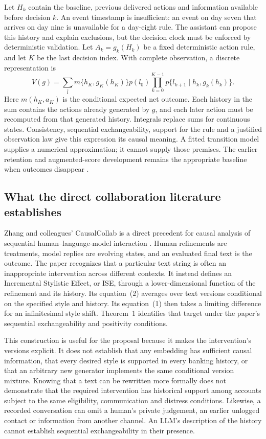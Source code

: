 Let $H_k$ contain the baseline, previous delivered actions and information
available before decision $k$. An event timestamp is insufficient: an event
on day seven that arrives on day nine is unavailable for a day-eight rule.
The assistant can propose this history and explain exclusions, but the
decision clock must be enforced by deterministic validation.
Let $A_k=g_k(H_k)$ be a fixed deterministic action rule, and let $K$ be the
last decision index. With complete observation, a discrete representation is
\begin{equation}
 V(g)=
 \sum_{\bar l}
 m\{h_K,g_K(h_K)\}p(l_0)
 \prod_{k=0}^{K-1}
 p\{l_{k+1}\mid h_k,g_k(h_k)\}.
 \label{eq:exec16-policy-recursion}
\end{equation}
Here $m(h_K,a_K)$ is the conditional expected net outcome. Each history in
the sum contains the actions already generated by $g$, and each later action
must be recomputed from that generated history. Integrals replace sums for
continuous states. Consistency, sequential exchangeability, support for the
rule and a justified observation law give this expression its causal
meaning. A fitted transition model supplies a numerical approximation; it
cannot supply those premises. The earlier retention and augmented-score
development remains the appropriate baseline when outcomes disappear
\citep{hernan2020}.

\subsection{What the direct collaboration literature establishes}

Zhang and colleagues' CausalCollab is a direct precedent for causal analysis
of sequential human--language-model interaction
\citep{exec13_census_collaboration}. Human refinements are treatments,
model replies are evolving states, and an evaluated final text is the
outcome. The paper recognizes that a particular text string is often an
inappropriate intervention across different contexts. It instead defines an
Incremental Stylistic Effect, or ISE, through a lower-dimensional function
of the refinement and its history. Its equation~(2) averages over text
versions conditional on the specified style and history. Its equation~(1)
then takes a limiting difference for an infinitesimal style shift.
Theorem~1 identifies that target under the paper's sequential
exchangeability and positivity conditions.

This construction is useful for the proposal because it makes the
intervention's versions explicit. It does not establish that any
embedding has sufficient causal information, that every desired style is
supported in every banking history, or that an arbitrary new generator
implements the same conditional version mixture.
Knowing that a text can be rewritten more formally does not demonstrate
that the required intervention has historical support among accounts
subject to the same eligibility, communication and distress conditions.
Likewise, a recorded conversation can omit a human's private judgement,
an earlier unlogged contact or information from another channel.
An LLM's description of the history cannot establish sequential
exchangeability in their presence.

